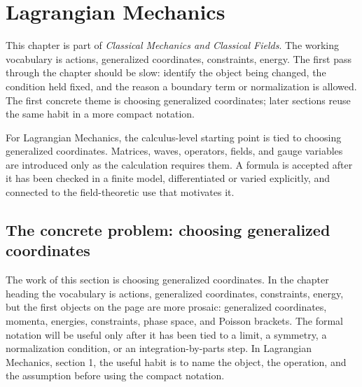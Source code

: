 \chapter{Lagrangian Mechanics}


This chapter is part of \emph{Classical Mechanics and Classical Fields}.  The working vocabulary is actions, generalized coordinates, constraints, energy.  The first pass through the chapter should be slow: identify the object being changed, the condition held fixed, and the reason a boundary term or normalization is allowed.  The first concrete theme is choosing generalized coordinates; later sections reuse the same habit in a more compact notation.

For Lagrangian Mechanics, the calculus-level starting point is tied to choosing generalized coordinates.  Matrices, waves, operators, fields, and gauge variables are introduced only as the calculation requires them.  A formula is accepted after it has been checked in a finite model, differentiated or varied explicitly, and connected to the field-theoretic use that motivates it.

\section{The concrete problem: choosing generalized coordinates}













The work of this section is choosing generalized coordinates.  In the chapter heading the vocabulary is actions, generalized coordinates, constraints, energy, but the first objects on the page are more prosaic: generalized coordinates, momenta, energies, constraints, phase space, and Poisson brackets.  The formal notation will be useful only after it has been tied to a limit, a symmetry, a normalization condition, or an integration-by-parts step.  In Lagrangian Mechanics, section 1, the useful habit is to name the object, the operation, and the assumption before using the compact notation.

